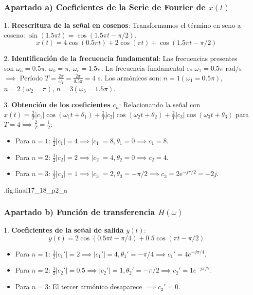 \newpage
\begin{resolucion}
\subsubsection*{Apartado a) Coeficientes de la Serie de Fourier de $x(t)$}

1. \textbf{Reescritura de la señal en cosenos}:
   Transformamos el término en seno a coseno: $\sin(1.5\pi t) = \cos(1.5\pi t - \pi/2)$.
   \[
   x(t) = 4\cos(0.5\pi t) + 2\cos(\pi t) + \cos(1.5\pi t - \pi/2)
   \]

2. \textbf{Identificación de la frecuencia fundamental}:
   Las frecuencias presentes son $\omega_a = 0.5\pi$, $\omega_b = \pi$, $\omega_c = 1.5\pi$.
   La frecuencia fundamental es $\omega_1 = 0.5\pi$ rad/s $\implies$ Período $T = \frac{2\pi}{\omega_1} = \frac{2\pi}{0.5\pi} = 4$ s.
   Los armónicos son: $n=1 (\omega_1 = 0.5\pi)$, $n=2 (\omega_2 = \pi)$, $n=3 (\omega_3 = 1.5\pi)$.

3. \textbf{Obtención de los coeficientes $c_n$}:
   Relacionando la señal con $x(t) = \frac{2}{T} |c_1| \cos(\omega_1 t + \theta_1) + \frac{2}{T} |c_2| \cos(\omega_2 t + \theta_2) + \frac{2}{T} |c_3| \cos(\omega_3 t + \theta_3)$ para $T=4 \implies \frac{2}{T} = \frac{1}{2}$:
   \begin{itemize}
       \item Para $n=1$: $\frac{1}{2}|c_1| = 4 \implies |c_1| = 8, \theta_1 = 0 \implies c_1 = 8$.
       \item Para $n=2$: $\frac{1}{2}|c_2| = 2 \implies |c_2| = 4, \theta_2 = 0 \implies c_2 = 4$.
       \item Para $n=3$: $\frac{1}{2}|c_3| = 1 \implies |c_3| = 2, \theta_3 = -\pi/2 \implies c_3 = 2 e^{-j\pi/2} = -2j$.
   \end{itemize}

%
         {.}{fig:final17_18_p2_a}

\newpage
\subsubsection*{Apartado b) Función de transferencia $H(\omega)$}

1. \textbf{Coeficientes de la señal de salida $y(t)$}:
   \[
   y(t) = 2\cos(0.5\pi t - \pi/4) + 0.5\cos(\pi t - \pi/2)
   \]
   \begin{itemize}
       \item Para $n=1$: $\frac{1}{2}|c_1'| = 2 \implies |c_1'| = 4, \theta_1' = -\pi/4 \implies c_1' = 4 e^{-j\pi/4}$.
       \item Para $n=2$: $\frac{1}{2}|c_2'| = 0.5 \implies |c_2'| = 1, \theta_2' = -\pi/2 \implies c_2' = 1 e^{-j\pi/2}$.
       \item Para $n=3$: El tercer armónico desaparece $\implies c_3' = 0$.
   \end{itemize}


\end{resolucion}
